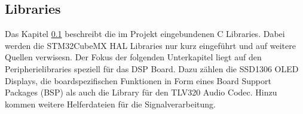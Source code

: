 \subsection{Libraries}
\label{sec:Libraries}

Das Kapitel \ref{sec:Libraries} beschreibt die im Projekt eingebundenen C Libraries.
Dabei werden die STM32CubeMX HAL Libraries nur kurz eingeführt und auf weitere Quellen verwisesn.
Der Fokus der folgenden Unterkapitel liegt auf den Peripherielibraries speziell für das DSP Board. 
Dazu zählen die SSD1306 OLED Displays, die boardspezifischen Funktionen in Form eines Board Support Packages (BSP) als auch die Library für den TLV320 Audio Codec. Hinzu kommen weitere Helferdateien für die Signalverarbeitung.


